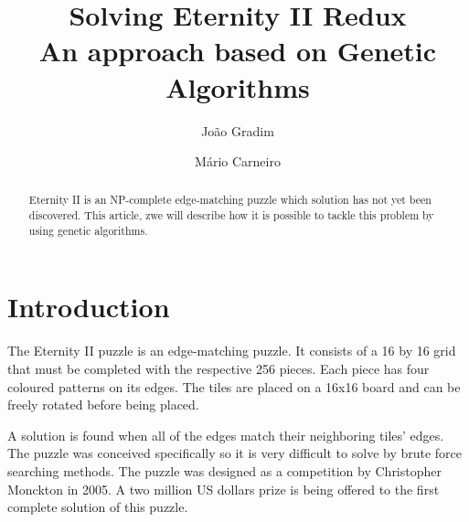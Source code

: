 \documentclass{llncs}
\begin{document}
%
\frontmatter          %
%
\pagestyle{headings}  %
%

\mainmatter              %
%
\title{Solving Eternity II Redux\\
	\small{An approach based on Genetic Algorithms}
}
%
%
\author{João Gradim \and Mário Carneiro}
%
%
%

\maketitle              %

\begin{abstract}
Eternity II is an NP-complete edge-matching puzzle which solution has not yet been discovered. This article, zwe will describe how it is possible to tackle this problem by using genetic algorithms.
\end{abstract}
%
\section{Introduction}\label{sec:introduction}


The Eternity II puzzle is an edge-matching puzzle. It consists of a 16 by 16 grid that must be completed with the respective 256 pieces. Each piece has four coloured patterns on its edges. The tiles are placed on a 16x16 board and can be freely rotated before being placed. 


A solution is found when all of the edges match their neighboring tiles' edges. The puzzle was conceived specifically so it is very difficult to solve by brute force searching methods. The puzzle was designed as a competition by Christopher Monckton in 2005. A two million US dollars prize is being offered to the first complete solution of this puzzle. 
\end{document}
